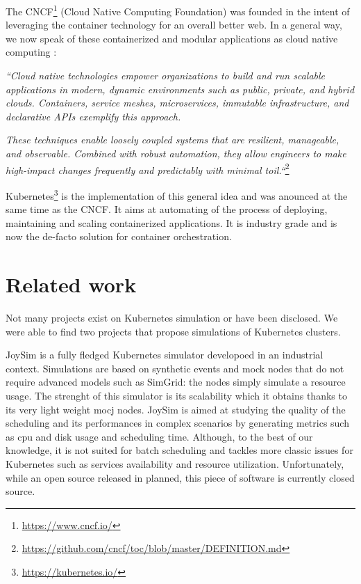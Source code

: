 The CNCF\footnote{\url{https://www.cncf.io/}} (Cloud Native Computing
Foundation) was founded in the intent of leveraging the container technology
for an overall better web. In a general way, we now speak of these
containerized and modular applications as cloud native computing :

\textit{``Cloud native technologies empower organizations to build and run
	scalable applications in modern, dynamic environments such as public,
	private, and hybrid clouds. Containers, service meshes, microservices,
	immutable infrastructure, and declarative APIs exemplify this
	approach.}

\textit{These techniques enable loosely coupled systems that
	are resilient, manageable, and observable.  Combined with robust
	automation, they allow engineers to make high-impact changes frequently
	and predictably with minimal toil.``}\footnote{\url{https://github.com/cncf/toc/blob/master/DEFINITION.md}}

Kubernetes\footnote{\url{https://kubernetes.io/}} is the implementation of this
general idea and was anounced at the same time as the CNCF. It aims at
automating of the process of deploying, maintaining and scaling containerized
applications. It is industry grade and is now the de-facto solution for
container orchestration.

\section{Related work}

Not many projects exist on Kubernetes simulation or have been disclosed. We
were able to find two projects that propose simulations of Kubernetes clusters.

JoySim \cite{joysim} is a fully fledged Kubernetes simulator developoed in an
industrial context. Simulations are based on synthetic events and mock nodes
that do not require advanced models such as SimGrid: the nodes simply simulate
a resource usage. The strenght of this simulator is its scalability which it
obtains thanks to its very light weight mocj nodes. JoySim is aimed at studying
the quality of the scheduling and its performances in complex scenarios by
generating metrics such as cpu and disk usage and scheduling time. Although, to
the best of our knowledge, it is not suited for batch scheduling and tackles
more classic issues for Kubernetes such as services availability and resource
utilization.  Unfortunately, while an open source released in planned, this
piece of software is currently closed source.

